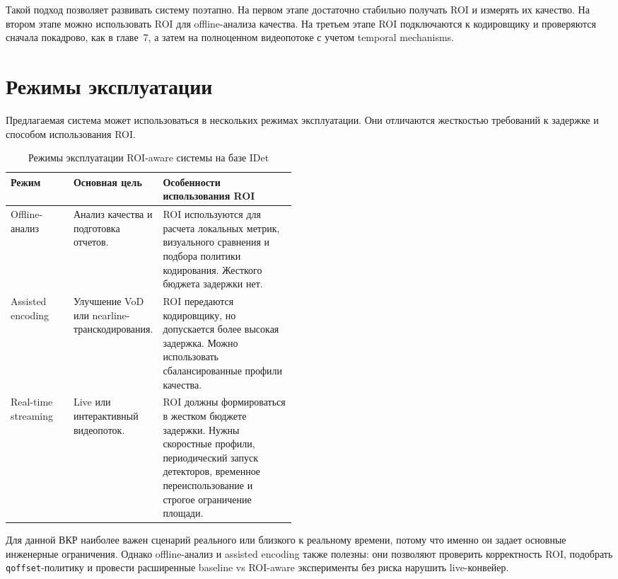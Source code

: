 \documentclass[12pt,a4paper,oneside,openany]{report}
\begin{document}
Такой подход позволяет развивать систему поэтапно. На первом этапе достаточно стабильно получать
ROI и измерять их качество. На втором этапе можно использовать ROI для offline-анализа качества.
На третьем этапе ROI подключаются к кодировщику и проверяются сначала покадрово, как в главе~7,
а затем на полноценном видеопотоке с учетом temporal mechanisms.


\section{Режимы эксплуатации}

Предлагаемая система может использоваться в нескольких режимах эксплуатации. Они отличаются
жесткостью требований к задержке и способом использования ROI.

\begin{table}[!htbp]
  \centering
  \caption{Режимы эксплуатации ROI-aware системы на базе IDet}
  \label{tab:deployment_modes}
  \small
  \begin{tabularx}{\linewidth}{@{}P{0.22\linewidth}P{0.25\linewidth}Y@{}}
    \toprule
    Режим & Основная цель & Особенности использования ROI \\
    \midrule
    Offline-анализ &
    Анализ качества и подготовка отчетов. &
    ROI используются для расчета локальных метрик, визуального сравнения и подбора политики
      кодирования. Жесткого бюджета задержки нет. \\
    Assisted encoding &
    Улучшение VoD или nearline-транскодирования. &
    ROI передаются кодировщику, но допускается более высокая задержка. Можно использовать
      сбалансированные профили качества. \\
    Real-time streaming &
    Live или интерактивный видеопоток. &
    ROI должны формироваться в жестком бюджете задержки. Нужны скоростные профили, периодический
      запуск детекторов, временное переиспользование и строгое ограничение площади. \\
    \bottomrule
  \end{tabularx}
\end{table}

Для данной ВКР наиболее важен сценарий реального или близкого к реальному времени, потому что
именно он задает основные инженерные ограничения. Однако offline-анализ и assisted encoding
также полезны: они позволяют проверить корректность ROI, подобрать \texttt{qoffset}-политику и
провести расширенные baseline vs ROI-aware эксперименты без риска нарушить live-конвейер.
\end{document}
